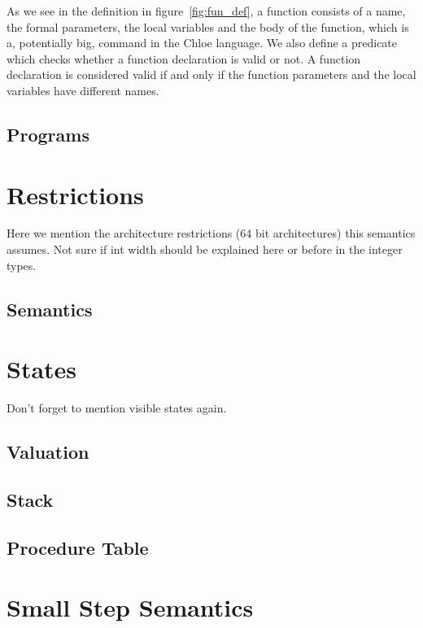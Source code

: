 As we see in the definition in figure~\ref{fig:fun_def}, a function consists of a name, the formal parameters, the local variables and the body of the function, which is a, potentially big, command in the Chloe language.
We also define a predicate which checks whether a function declaration is valid or not.
A function declaration is considered valid if and only if the function parameters and the local variables have different names.




\subsection{Programs}\label{subsection:programs_commands}
\section{Restrictions}\label{subsection:restrictions_commands}
Here we mention the architecture restrictions (64 bit architectures) this semantics assumes.
Not sure if int width should be explained here or before in the integer types.


\subsection{Semantics}\label{subsection:semantics_commands}


\section{States}\label{section:states}

Don't forget to mention visible states again.

\subsection{Valuation}\label{subsection:valuation}
\subsection{Stack}\label{subsection:stack}
\subsection{Procedure Table}\label{subsection:procedure_table}

\section{Small Step Semantics}\label{section:small_step}

